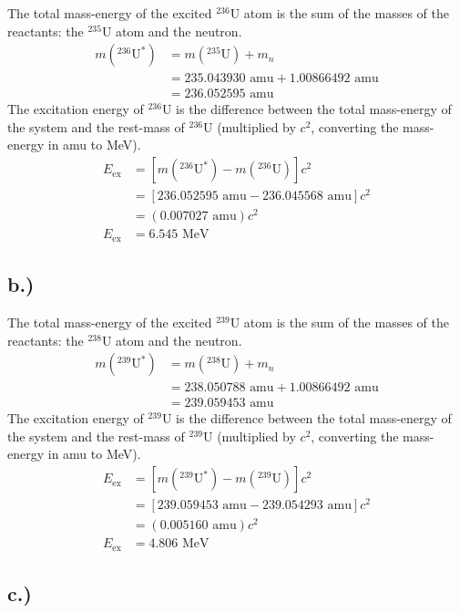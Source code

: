 \documentclass{report}
\begin{document}
The total mass-energy of the excited $^{236}$U atom is the sum of the masses of the reactants: the $^{235}$U atom and the neutron.
\begin{align*}
m(^{236}\text{U}^*)	&= m(^{235}\text{U}) + m_n \\
					&= 235.043930\text{ amu} + 1.00866492\text{ amu} \\
					&= 236.052595\text{ amu}
\end{align*}
The excitation energy of $^{236}$U is the difference between the total mass-energy of the system and the rest-mass of $^{236}$U (multiplied by $c^2$, converting the mass-energy in amu to MeV).
\begin{align*}
E_{\text{ex}}	&= \left[m(^{236}\text{U}^*) - m(^{236}\text{U})\right]c^2 \\
				&= \left[236.052595\text{ amu} - 236.045568\text{ amu}\right]c^2 \\
				&= (0.007027\text{ amu})c^2 \\
E_{\text{ex}}	&= 6.545\text{ MeV} 
\end{align*}


\subsection*{b.)}

The total mass-energy of the excited $^{239}$U atom is the sum of the masses of the reactants: the $^{238}$U atom and the neutron.
\begin{align*}
m(^{239}\text{U}^*)	&= m(^{238}\text{U}) + m_n \\
					&= 238.050788\text{ amu} + 1.00866492\text{ amu} \\
					&= 239.059453\text{ amu}
\end{align*}
The excitation energy of $^{239}$U is the difference between the total mass-energy of the system and the rest-mass of $^{239}$U (multiplied by $c^2$, converting the mass-energy in amu to MeV).
\begin{align*}
E_{\text{ex}}	&= \left[m(^{239}\text{U}^*) - m(^{239}\text{U})\right]c^2 \\
				&= \left[239.059453\text{ amu} - 239.054293\text{ amu}\right]c^2 \\
				&= (0.005160\text{ amu})c^2 \\
E_{\text{ex}}	&= 4.806\text{ MeV} 
\end{align*}


\subsection*{c.)}
\end{document}
